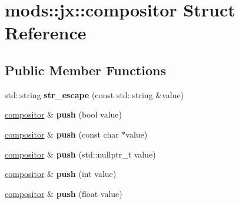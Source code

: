 \hypertarget{structmods_1_1jx_1_1compositor}{}\section{mods\+:\+:jx\+:\+:compositor Struct Reference}
\label{structmods_1_1jx_1_1compositor}
\subsection*{Public Member Functions}
\begin{DoxyCompactItemize}
\item 
\mbox{\label{structmods_1_1jx_1_1compositor_a00a5b7ca3219aec0f4be679b315a8758}} 
std\+::string {\bfseries str\+\_\+escape} (const std\+::string \&value)
\item 
\mbox{\label{structmods_1_1jx_1_1compositor_af8d3843f188c0dc200aaf16d36b01e89}} 
\hyperlink{structmods_1_1jx_1_1compositor}{compositor} \& {\bfseries push} (bool value)
\item 
\mbox{\label{structmods_1_1jx_1_1compositor_a2a2b274ad76da253bbdd0cb54c2e7b3d}} 
\hyperlink{structmods_1_1jx_1_1compositor}{compositor} \& {\bfseries push} (const char $\ast$value)
\item 
\mbox{\label{structmods_1_1jx_1_1compositor_a88aea5d0c18c57460125d03de7e31a4e}} 
\hyperlink{structmods_1_1jx_1_1compositor}{compositor} \& {\bfseries push} (std\+::nullptr\+\_\+t value)
\item 
\mbox{\label{structmods_1_1jx_1_1compositor_a02c4c7f77d8c4ac01752ed6b27515fc6}} 
\hyperlink{structmods_1_1jx_1_1compositor}{compositor} \& {\bfseries push} (int value)
\item 
\mbox{\label{structmods_1_1jx_1_1compositor_a01c0200cbf32ac2346517b9ed1a371ef}} 
\hyperlink{structmods_1_1jx_1_1compositor}{compositor} \& {\bfseries push} (float value)
\item 
\mbox{\label{structmods_1_1jx_1_1compositor_a3ae4f06f372a196373475adf76f99488}} 

\end{DoxyCompactItemize}
